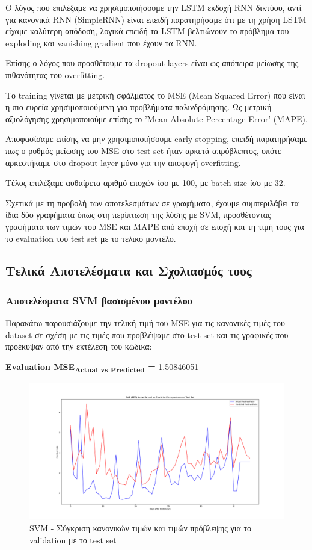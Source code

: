 \documentclass[12pt,a4paper]{article}
\begin{document}
Ο λόγος που επιλέξαμε να χρησιμοποιήσουμε την LSTM εκδοχή RNN δικτύου, αντί για κανονικά RNN (SimpleRNN) είναι επειδή παρατηρήσαμε ότι με τη χρήση LSTM είχαμε καλύτερη απόδοση, λογικά επειδή τα LSTM βελτιώνουν το πρόβλημα του exploding και vanishing gradient που έχουν τα RNN.

Επίσης ο λόγος που προσθέτουμε τα dropout layers είναι ως απόπειρα μείωσης της πιθανότητας του overfitting.

Το training γίνεται με μετρική σφάλματος το MSE (Mean Squared Error) που είναι η πιο ευρεία χρησιμοποιούμενη για προβλήματα παλινδρόμησης. Ως μετρική αξιολόγησης χρησιμοποιούμε επίσης το 'Mean Absolute Percentage Error' (MAPE).

Αποφασίσαμε επίσης να μην χρησιμοποιήσουμε early stopping, επειδή παρατηρήσαμε πως ο ρυθμός μείωσης του MSE στο test set ήταν αρκετά απρόβλεπτος, οπότε αρκεστήκαμε στο dropout layer μόνο για την αποφυγή overfitting.

Τέλος επιλέξαμε αυθαίρετα αριθμό εποχών ίσο με 100, με batch size ίσο με 32.

Σχετικά με τη προβολή των αποτελεσμάτων σε γραφήματα, έχουμε συμπεριλάβει τα ίδια δύο γραφήματα όπως στη περίπτωση της λύσης με SVM, προσθέτοντας γραφήματα των τιμών του MSE και MAPE από εποχή σε εποχή και τη τιμή τους για το evaluation του test set με το τελικό μοντέλο.

\subsection{Τελικά Αποτελέσματα και Σχολιασμός τους}

\subsubsection{Αποτελέσματα SVM βασισμένου μοντέλου}

Παρακάτω παρουσιάζουμε την τελική τιμή του MSE για τις κανονικές τιμές του dataset σε σχέση με τις τιμές που προβλέψαμε στο test set και τις γραφικές που προέκυψαν από την εκτέλεση του κώδικα:

\textbf{Evaluation MSE\textsubscript{Actual vs Predicted} =} 1.50846051

\begin{figure}[H]
	\includegraphics[width=\textwidth]{Figures/Question3/1. SVR Actual vs Predicted Test Set.png}
	\caption{SVM - Σύγκριση κανονικών τιμών και τιμών πρόβλεψης για το validation με το test set}
\end{figure}
\end{document}
